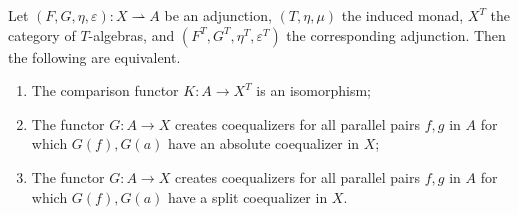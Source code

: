 \begin{theorem}[Beck]\label{thm:6.4}
	Let $(F,G,\eta,\varepsilon ) : X\rightharpoonup A$ be an adjunction, $(T,\eta,\mu)$ the induced monad, $X^T$ the category of $T$-algebras, and $(F^T,G^T,\eta^T,\varepsilon ^T)$ the corresponding adjunction. Then the following are equivalent.
	\begin{enumerate}
		\item The comparison functor $K : A \to X^T$ is an isomorphism;
		\item The functor $G : A \to X$ creates coequalizers for all parallel pairs $f,g$ in $A$ for which $G(f),G(a)$ have an absolute coequalizer in $X$;
		\item The functor $G : A \to X$ creates coequalizers for all parallel pairs $f,g$ in $A$ for which $G(f),G(a)$ have a split coequalizer in $X$.
	\end{enumerate}
\end{theorem}

